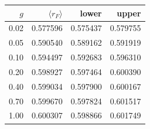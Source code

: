 \begin{tabular}{rrrr}
\hline\hline
$g$ & $\langle r_F\rangle$ & lower & upper \\
\hline
0.02 & 0.577596 & 0.575437 & 0.579755 \\
0.05 & 0.590540 & 0.589162 & 0.591919 \\
0.10 & 0.594497 & 0.592683 & 0.596310 \\
0.20 & 0.598927 & 0.597464 & 0.600390 \\
0.40 & 0.599034 & 0.597900 & 0.600167 \\
0.70 & 0.599670 & 0.597824 & 0.601517 \\
1.00 & 0.600307 & 0.598866 & 0.601749 \\
\hline\hline
\end{tabular}
